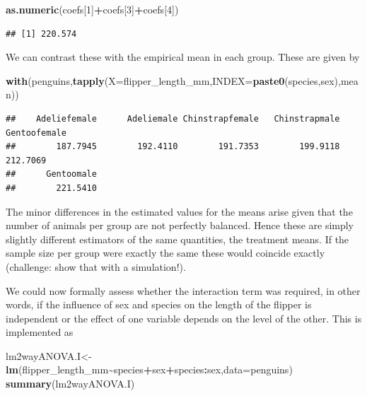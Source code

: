 \documentclass[
]{book}
\newenvironment{Shaded}{\begin{snugshade}}{\end{snugshade}}
\newcommand{\AttributeTok}[1]{\textcolor[rgb]{0.13,0.29,0.53}{#1}}
\newcommand{\DecValTok}[1]{\textcolor[rgb]{0.00,0.00,0.81}{#1}}
\newcommand{\FunctionTok}[1]{\textcolor[rgb]{0.13,0.29,0.53}{\textbf{#1}}}
\newcommand{\NormalTok}[1]{#1}
\newcommand{\OtherTok}[1]{\textcolor[rgb]{0.56,0.35,0.01}{#1}}
\newcommand{\SpecialCharTok}[1]{\textcolor[rgb]{0.81,0.36,0.00}{\textbf{#1}}}
\begin{document}
\begin{Shaded}
\begin{Highlighting}[]
\FunctionTok{as.numeric}\NormalTok{(coefs[}\DecValTok{1}\NormalTok{]}\SpecialCharTok{+}\NormalTok{coefs[}\DecValTok{3}\NormalTok{]}\SpecialCharTok{+}\NormalTok{coefs[}\DecValTok{4}\NormalTok{])}
\end{Highlighting}
\end{Shaded}

\begin{verbatim}
## [1] 220.574
\end{verbatim}

We can contrast these with the empirical mean in each group. These are given by

\begin{Shaded}
\begin{Highlighting}[]
\FunctionTok{with}\NormalTok{(penguins,}\FunctionTok{tapply}\NormalTok{(}\AttributeTok{X=}\NormalTok{flipper\_length\_mm,}\AttributeTok{INDEX=}\FunctionTok{paste0}\NormalTok{(species,sex),mean))}
\end{Highlighting}
\end{Shaded}

\begin{verbatim}
##    Adeliefemale      Adeliemale Chinstrapfemale   Chinstrapmale    Gentoofemale 
##        187.7945        192.4110        191.7353        199.9118        212.7069 
##      Gentoomale 
##        221.5410
\end{verbatim}

The minor differences in the estimated values for the means arise given that the number of animals per group are not perfectly balanced. Hence these are simply slightly different estimators of the same quantities, the treatment means. If the sample size per group were exactly the same these would coincide exactly (challenge: show that with a simulation!).

We could now formally assess whether the interaction term was required, in other words, if the influence of sex and species on the length of the flipper is independent or the effect of one variable depends on the level of the other. This is implemented as

\begin{Shaded}
\begin{Highlighting}[]
\NormalTok{lm2wayANOVA.I}\OtherTok{\textless{}{-}}\FunctionTok{lm}\NormalTok{(flipper\_length\_mm}\SpecialCharTok{\textasciitilde{}}\NormalTok{species}\SpecialCharTok{+}\NormalTok{sex}\SpecialCharTok{+}\NormalTok{species}\SpecialCharTok{:}\NormalTok{sex,}\AttributeTok{data=}\NormalTok{penguins)}
\FunctionTok{summary}\NormalTok{(lm2wayANOVA.I)}
\end{Highlighting}
\end{Shaded}
\end{document}
